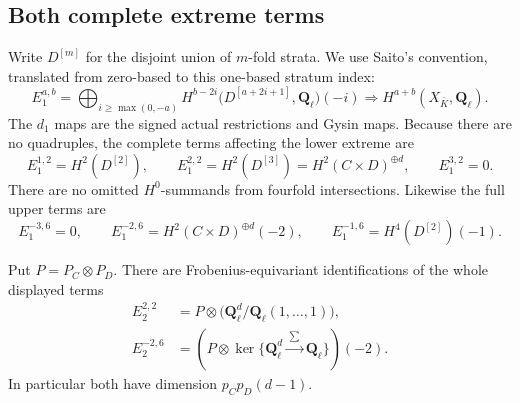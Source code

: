 \subsection{Both complete extreme terms}

Write $D^{[m]}$ for the disjoint union of $m$-fold strata.  We use
Saito's convention, translated from zero-based to this one-based
stratum index:
\[
 E_1^{a,b}=\bigoplus_{i\ge\max(0,-a)}
 H^{b-2i}\bigl(D^{[a+2i+1]},\mathbf Q_\ell\bigr)(-i)
                 \Longrightarrow H^{a+b}(X_{\bar K},\mathbf Q_\ell).
 \tag{DW22.6}\label{r22dw:RZ}
\]
The $d_1$ maps are the signed actual restrictions and Gysin maps.
Because there are no quadruples, the complete terms affecting the
lower extreme are
\[
 E_1^{1,2}=H^2(D^{[2]}),\qquad
 E_1^{2,2}=H^2(D^{[3]})=H^2(C\times D)^{\oplus d},
 \qquad E_1^{3,2}=0.
 \tag{DW22.7}\label{r22dw:lowerterms}
\]
There are no omitted $H^0$-summands from fourfold intersections.
Likewise the full upper terms are
\[
 E_1^{-3,6}=0,\qquad
 E_1^{-2,6}=H^2(C\times D)^{\oplus d}(-2),\qquad
 E_1^{-1,6}=H^4(D^{[2]})(-1).
 \tag{DW22.8}\label{r22dw:upperterms}
\]

\begin{proposition}
\label{r22dw:extremes}
Put $P=P_C\otimes P_D$.  There are Frobenius-equivariant
identifications of the whole displayed terms
\[
\begin{aligned}
 E_2^{2,2}&=P\otimes
     \bigl(\mathbf Q_\ell^d/\mathbf Q_\ell(1,\ldots,1)\bigr),\\
 E_2^{-2,6}&=
   \left(P\otimes\ker\{\mathbf Q_\ell^d
                         \xrightarrow{\ \sum\ }\mathbf Q_\ell\}\right)(-2).
\end{aligned}
 \tag{DW22.9}\label{r22dw:extremeformula}
\]
In particular both have dimension $p_Cp_D(d-1)$.
\end{proposition}

